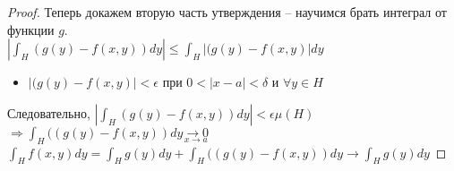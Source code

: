\begin{proof}
    Теперь докажем вторую часть утверждения -- научимся брать интеграл от функции $g$.\\
    $\displaystyle \left|\int_{H} (g(y) - f(x, y))dy\right| \leqslant
    \int_{H} |(g(y) - f(x, y)|dy$ 
    \begin{itemize}
        \item $ |(g(y) - f(x, y)| < \epsilon$ при $ 0 < |x - a| < \delta$ и $\forall y \in H$
    \end{itemize}
    Следовательно, $\displaystyle \left|\int_{H} (g(y) - f(x, y))dy\right| < \epsilon \mu(H)$ \\
    $\displaystyle \Rightarrow \int_{H} ((g(y) - f(x, y))dy \underset{x \to a}{\to 0}$ \\
    $\displaystyle \int_{H} f(x,y)dy = \int_{H} g(y)dy + \int_{H} ((g(y) - f(x, y))dy 
    \to \int_{H} g(y)dy$ 
\end{proof}

